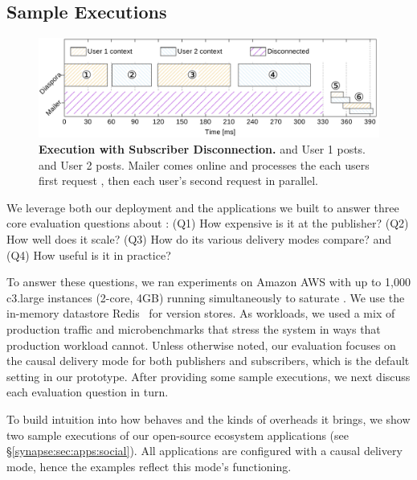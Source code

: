 \subsection{Sample Executions}
\label{synapse:sec:evaluation:sample-runs}
\begin{figure}
  \centering
  \includegraphics[width=\linewidth]{figures/synapse/diaspora2.pdf}
  \caption{{\bf Execution with Subscriber Disconnection.}
     and  User 1 posts.  and  User 2 posts.
    Mailer comes online and processes the each users first request , then
  each user's second request  in parallel.}
  \label{synapse:fig:diaspora2}
\end{figure}

We leverage both our deployment and the applications we built to answer three
core evaluation questions about \synapse: (Q1) How expensive is it
at the publisher? (Q2) How well does it scale? (Q3) How do its various
delivery modes compare? and (Q4) How useful is it in practice?

To answer these questions, we ran experiments on Amazon AWS with up to 1,000
c3.large instances (2-core, 4GB) running simultaneously to saturate \synapse.
We use the in-memory datastore Redis~\cite{redis} for version stores.
As workloads, we used a mix of \crowdtap production traffic and microbenchmarks
that stress the system in ways that production workload cannot.  Unless
otherwise noted, our evaluation focuses on the causal delivery mode for both publishers and subscribers, which is
the default setting in our prototype.  After providing some sample executions,
we next discuss each evaluation question in turn.

To build intuition into how \synapse behaves and the kinds of overheads it
brings, we show two sample executions of our open-source ecosystem
applications (see \S\ref{synapse:sec:apps:social}). All applications are configured
with a causal delivery mode, hence the examples reflect this mode's functioning.


